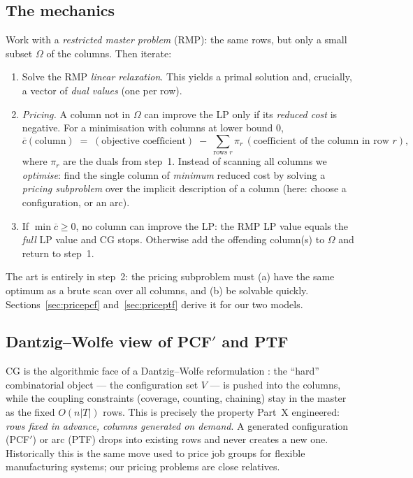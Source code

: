 \documentclass[11pt,a4paper]{article}
\theoremstyle{plain}
\theoremstyle{definition}
\newcommand{\RC}{\overline{c}}
\begin{document}
\subsection{The mechanics}
Work with a \emph{restricted master problem} (RMP): the same rows, but only a small subset
$\Omega$ of the columns. Then iterate:
\begin{enumerate}
\item Solve the RMP \emph{linear relaxation}. This yields a primal solution and, crucially, a
      vector of \emph{dual values} (one per row).
\item \emph{Pricing.} A column not in $\Omega$ can improve the LP only if its \emph{reduced cost}
      is negative. For a minimisation with columns at lower bound $0$,
      \[
        \RC(\text{column})\;=\;(\text{objective coefficient})\;-\;\sum_{\text{rows }r}
        \pi_r\,(\text{coefficient of the column in row }r),
      \]
      where $\pi_r$ are the duals from step~1. Instead of scanning all columns we \emph{optimise}:
      find the single column of \emph{minimum} reduced cost by solving a \emph{pricing
      subproblem} over the implicit description of a column (here: choose a configuration, or an
      arc).
\item If $\min\RC\ge0$, no column can improve the LP: the RMP LP value equals the
      \emph{full} LP value and CG stops. Otherwise add the offending column(s) to $\Omega$ and
      return to step~1.
\end{enumerate}
The art is entirely in step~2: the pricing subproblem must (a) have the same optimum as a brute
scan over all columns, and (b) be solvable quickly. Sections~\ref{sec:pricepcf}
and~\ref{sec:priceptf} derive it for our two models.

\subsection{Dantzig--Wolfe view of PCF$'$ and PTF}
CG is the algorithmic face of a Dantzig--Wolfe reformulation \citep{Vanderbeck2010}: the
``hard'' combinatorial object --- the configuration set $V$ --- is pushed into the columns, while
the coupling constraints (coverage, counting, chaining) stay in the master as the fixed
$O(n|T|)$ rows. This is precisely the property Part~X engineered: \emph{rows fixed in advance,
columns generated on demand}. A generated configuration (PCF$'$) or arc (PTF) drops into existing
rows and never creates a new one. Historically this is the same move \citet{Crama1994Column} used
to price job groups for flexible manufacturing systems; our pricing problems are close relatives.
\end{document}
